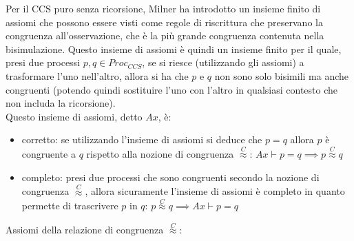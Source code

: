 Per il CCS puro senza ricorsione, Milner ha introdotto un insieme finito di assiomi che possono essere visti come regole di riscrittura che preservano la congruenza all’osservazione, che è la più grande congruenza contenuta nella bisimulazione. 
Questo insieme di assiomi è quindi un insieme finito per il quale, presi due processi $p,q\in Proc_{CCS}$, se si riesce (utilizzando gli assiomi) a trasformare l’uno nell’altro, allora si ha che $p$ e $q$ non sono solo bisimili ma anche congruenti (potendo quindi sostituire l’uno con l’altro in qualsiasi contesto che non includa la ricorsione). \\
Questo insieme di assiomi, detto $Ax$, è:
\begin{itemize}
    \item corretto: se utilizzando l’insieme di assiomi si deduce che $p=q$ allora $p$ è congruente a $q$ rispetto alla nozione di congruenza $\stackrel{C}{\approx}$: $Ax\vdash p=q\implies p \stackrel{C}{\approx} q$
    \item completo: presi due processi che sono congruenti secondo la nozione di congruenza $\stackrel{C}{\approx}$, allora sicuramente l’insieme di assiomi è completo in quanto permette di trascrivere $p$ in $q$: $p \stackrel{C}{\approx} q\implies Ax\vdash p=q$
    \end{itemize}
    Assiomi della relazione di congruenza $\stackrel{C}{\approx}$:
